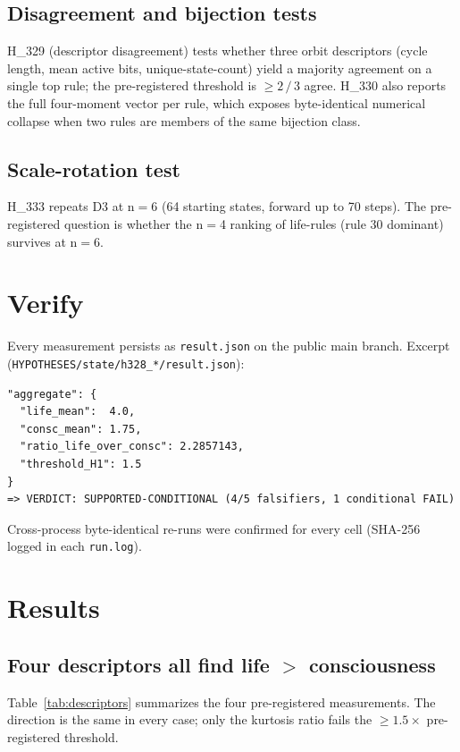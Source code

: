 \documentclass[11pt,a4paper]{article}
\begin{document}
\subsection{Disagreement and bijection tests}
H\_329 (descriptor disagreement) tests whether three orbit
descriptors (cycle length, mean active bits, unique-state-count) yield
a majority agreement on a single top rule; the pre-registered
threshold is $\geq 2\,/\,3$ agree. H\_330 also reports the full
four-moment vector per rule, which exposes byte-identical numerical
collapse when two rules are members of the same bijection class.

\subsection{Scale-rotation test}
H\_333 repeats D3 at n$=$6 (64 starting states, forward up to 70
steps). The pre-registered question is whether the n$=$4 ranking of
life-rules (rule 30 dominant) survives at n$=$6.

\section{Verify}
\label{sec:verify}

Every measurement persists as \texttt{result.json} on the public main
branch. Excerpt (\texttt{HYPOTHESES/state/h328\_*/result.json}):

\begin{lstlisting}[basicstyle=\ttfamily\small,frame=single,xleftmargin=0pt]
"aggregate": {
  "life_mean":  4.0,
  "consc_mean": 1.75,
  "ratio_life_over_consc": 2.2857143,
  "threshold_H1": 1.5
}
=> VERDICT: SUPPORTED-CONDITIONAL (4/5 falsifiers, 1 conditional FAIL)
\end{lstlisting}

Cross-process byte-identical re-runs were confirmed for every cell
(SHA-256 logged in each \texttt{run.log}).

\section{Results}
\label{sec:results}

\subsection{Four descriptors all find life $>$ consciousness}
Table~\ref{tab:descriptors} summarizes the four pre-registered
measurements. The direction is the same in every case; only the
kurtosis ratio fails the $\geq 1.5\times$ pre-registered threshold.
\end{document}
